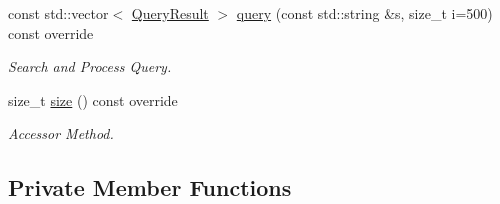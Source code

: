 \begin{DoxyCompactItemize}
const std\+::vector$<$ \hyperlink{class_query_result}{Query\+Result} $>$ \hyperlink{class_sentence_indexer_acc4165c39f2193050d207861936927a7}{query} (const std\+::string \&s, size\+\_\+t i=500) const override
\begin{DoxyCompactList}\small\item\em Search and Process Query. \end{DoxyCompactList}\item 
size\+\_\+t \hyperlink{class_sentence_indexer_a47409c62e1607ae3919a77080fe240a0}{size} () const override
\begin{DoxyCompactList}\small\item\em Accessor Method. \end{DoxyCompactList}\end{DoxyCompactItemize}
\subsection*{Private Member Functions}
